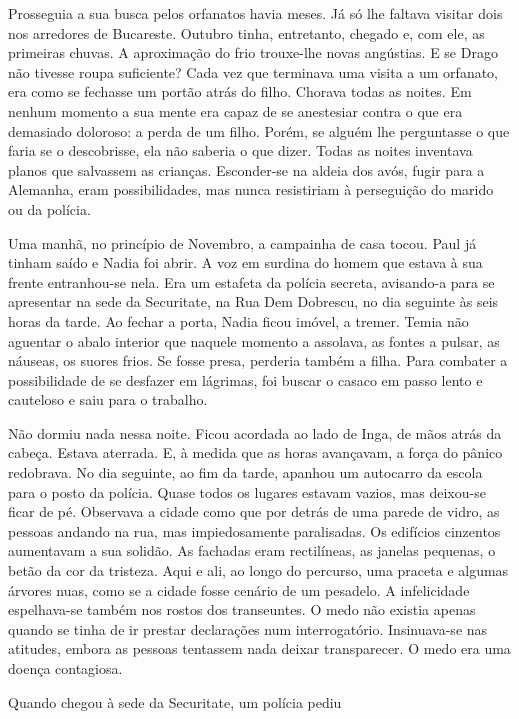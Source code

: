 Prosseguia a sua busca pelos orfanatos havia meses. Já só lhe faltava
visitar dois nos arredores de Bucareste. Outubro tinha, entretanto,
chegado e, com ele, as primeiras chuvas. A aproximação do frio
trouxe-lhe novas angústias. E se Drago não tivesse roupa suficiente?
Cada vez que terminava uma visita a um orfanato, era como se fechasse um
portão atrás do filho. Chorava todas as noites. Em nenhum momento a sua
mente era capaz de se anestesiar contra o que era demasiado doloroso:
a perda de um filho. Porém, se alguém lhe perguntasse o que faria se o
descobrisse, ela não saberia o que dizer. Todas as noites inventava
planos que salvassem as crianças. Esconder-se na aldeia dos avós, fugir
para a Alemanha, eram possibilidades, mas nunca resistiriam à
perseguição do marido ou da polícia.

Uma manhã, no princípio de Novembro, a campainha
de casa tocou. Paul já tinham saído e Nadia foi abrir. A voz em surdina
do homem que estava à sua frente entranhou-se nela. Era um estafeta da polícia secreta, avisando-a para se
apresentar na sede da Securitate, na Rua Dem Dobrescu, no dia seguinte
às seis horas da tarde. Ao fechar a porta, Nadia ficou imóvel, a tremer.
Temia não aguentar
o abalo interior que naquele momento a assolava, as fontes a pulsar, as
náuseas, os suores frios. Se fosse presa, perderia também a filha. Para
combater a possibilidade de se desfazer em lágrimas, foi buscar o
casaco em passo lento e cauteloso e saiu para o trabalho.

Não dormiu nada nessa noite. Ficou acordada ao lado de Inga, de mãos
atrás da cabeça. Estava aterrada. E, à medida que as horas avançavam, a
força do pânico redobrava. No dia seguinte, ao fim da tarde, apanhou
um autocarro da escola para o posto da polícia. Quase todos os lugares
estavam vazios, mas deixou-se ficar de pé. Observava a cidade como que
por detrás de uma parede de vidro, as pessoas andando na rua, mas
impiedosamente paralisadas. Os edifícios cinzentos aumentavam a sua
solidão. As fachadas eram rectilíneas, as janelas pequenas, o betão da
cor da tristeza. Aqui e ali, ao longo do percurso, uma praceta e
algumas árvores nuas, como se a cidade fosse cenário de um pesadelo. A
infelicidade espelhava-se também nos rostos dos transeuntes. O medo
não existia apenas quando se tinha de ir prestar declarações num
interrogatório. Insinuava-se nas atitudes, embora as pessoas tentassem
nada deixar transparecer. O medo era uma doença contagiosa.

Quando chegou à sede da Securitate, um polícia pediu


